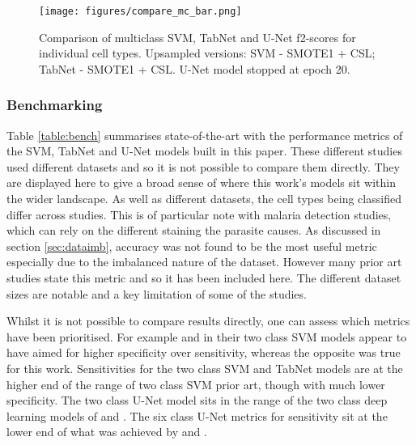 \documentclass[final,5p,times,twocolumn,authoryear]{elsarticle}
\begin{document}
\begin{figure}[t!]
	\centering
	\texttt{[image: figures/compare\_mc\_bar.png]}
	\caption[Comparison of multiclass models' f2-score]{Comparison of multiclass SVM, TabNet and U-Net f2-scores for individual cell types. Upsampled versions: SVM - SMOTE1 + CSL; TabNet - SMOTE1 + CSL. U-Net model stopped at epoch 20.}
	\label{fig:mc_compare_cells}
\end{figure}


\subsubsection{Benchmarking}
\label{subsec:Benchmarking}

Table \ref{table:bench} summarises state-of-the-art with the performance metrics of the SVM, TabNet and U-Net models built in this paper. 
These different studies used different datasets and so it is not possible to compare them directly. They are displayed here to give a broad sense of where this work's models sit within the wider landscape. As well as different datasets, the cell types being classified differ across studies. This is of particular note with malaria detection studies, which can rely on the different staining the parasite causes. As discussed in section \ref{sec:dataimb}, accuracy was not found to be the most useful metric especially due to the imbalanced nature of the dataset. However many prior art studies state this metric and so it has been included here. The different dataset sizes are notable and a key limitation of some of the studies.

Whilst it is not possible to compare results directly, one can assess which metrics have been prioritised. For example \citet{Diaz2009AImages} and \citet{Devi2018MalariaSmear} in their two class SVM models appear to have aimed for higher specificity over sensitivity, whereas the opposite was true for this work. Sensitivities for the two class SVM and TabNet models are at the higher end of the range of two class SVM prior art, though with much lower specificity.
The two class U-Net model sits in the range of the two class deep learning models of \citet{Tomari2014ComputerImage} and \citet{Lee2014CellImages}.
The six class U-Net metrics for sensitivity sit at the lower end of what was achieved by \citet{Xu2017AAnemia} and \citet{Durant2017VeryErythrocytes}.
\end{document}
